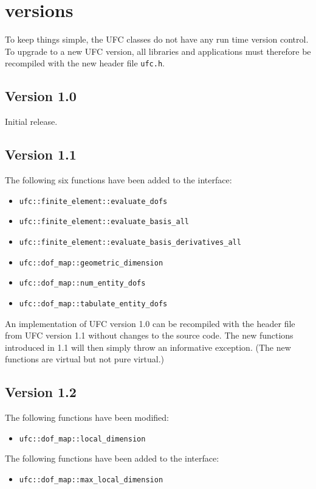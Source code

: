 \chapter{\ufc{} versions}
\label{app:versions}

To keep things simple, the UFC classes do not have any run time
version control. To upgrade to a new UFC version, all libraries and
applications must therefore be recompiled with the new header file
\texttt{ufc.h}.

\section{Version 1.0}
Initial release.

\section{Version 1.1}
The following six functions have been added to the interface:
\begin{itemize}
\item \texttt{ufc::finite\_element::evaluate\_dofs}
\item \texttt{ufc::finite\_element::evaluate\_basis\_all}
\item \texttt{ufc::finite\_element::evaluate\_basis\_derivatives\_all}
\item \texttt{ufc::dof\_map::geometric\_dimension}
\item \texttt{ufc::dof\_map::num\_entity\_dofs}
\item \texttt{ufc::dof\_map::tabulate\_entity\_dofs}
\end{itemize}

An implementation of UFC version 1.0 can be recompiled with the header
file from UFC version 1.1 without changes to the source code. The new
functions introduced in 1.1 will then simply throw an informative
exception. (The new functions are virtual but not pure virtual.)

\section{Version 1.2}
The following functions have been modified:
\begin{itemize}
\item \texttt{ufc::dof\_map::local\_dimension}
\end{itemize}
The following functions have been added to the interface:
\begin{itemize}
\item \texttt{ufc::dof\_map::max\_local\_dimension}
\end{itemize}

